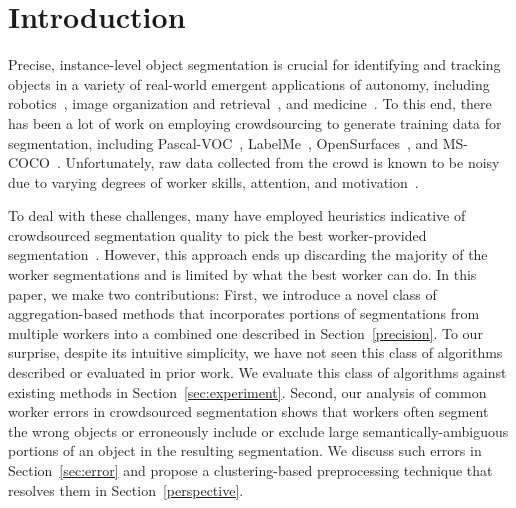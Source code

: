 \documentclass[letterpaper]{article}
\begin{document}
\section{Introduction\label{sec:intro}}
Precise, instance-level object segmentation is crucial for identifying and tracking objects in a variety of real-world emergent applications of autonomy, including robotics~\cite{Natonek1998}, image organization and retrieval~\cite{Yamaguchi2012}, and medicine~\cite{Irshad2014}. To this end, there has been a lot of work on employing crowdsourcing to generate training data for segmentation, including Pascal-VOC~\cite{Everingham15}, LabelMe~\cite{Torralba2010}, OpenSurfaces~\cite{bell15minc}, and MS-COCO~\cite{Lin2012}. Unfortunately, raw data collected from the crowd is known to be noisy due to varying degrees of worker skills, attention, and motivation~\cite{bell14intrinsic,MDWWelinder2010}. 
\par To deal with these challenges, many have employed heuristics indicative of crowdsourced segmentation quality to pick the best worker-provided segmentation~\cite{Sorokin2008,Vittayakorn2011}. However, this approach ends up discarding the majority of the worker segmentations and is limited by what the best worker can do. In this paper, we make two contributions: First, we introduce a novel class of aggregation-based methods that incorporates portions of segmentations from multiple workers into a combined one described in Section~\ref{precision}. To our surprise, despite its intuitive simplicity, we have not seen this class of algorithms described or evaluated in prior work. We evaluate this class of algorithms against existing methods in Section~\ref{sec:experiment}. Second, our analysis of common worker errors in crowdsourced segmentation shows that workers often segment the wrong objects or erroneously include or exclude large semantically-ambiguous portions of an object in the resulting segmentation. We discuss such errors in Section~\ref{sec:error} and propose a clustering-based preprocessing technique that resolves them in Section~\ref{perspective}.%


\end{document}
